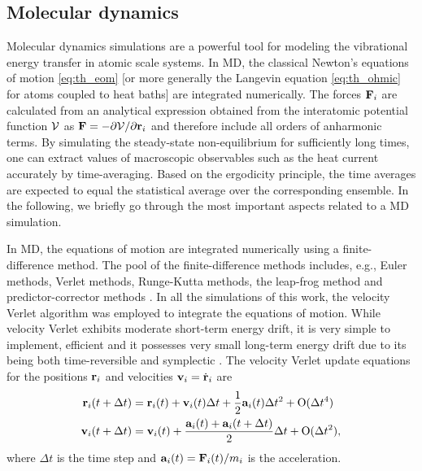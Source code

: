 \subsection{Molecular dynamics}


Molecular dynamics simulations are a powerful tool for modeling the vibrational energy transfer in atomic scale systems. In MD, the classical Newton's equations of motion \eqref{eq:th_eom} [or more generally the Langevin equation \eqref{eq:th_ohmic} for atoms coupled to heat baths] are integrated numerically. The forces $\mathbf{F}_i$ are calculated from an analytical expression obtained from the interatomic potential function $\mathcal{V}$ as $\mathbf{F}=-\partial \mathcal{V}/\partial \mathbf{r}_i$ and therefore include all orders of anharmonic terms. By simulating the steady-state non-equilibrium for sufficiently long times, one can extract values of macroscopic observables such as the heat current accurately by time-averaging. Based on the ergodicity principle, the time averages are expected to equal the statistical average over the corresponding ensemble. In the following, we briefly go through the most important aspects related to a MD simulation.




In MD, the equations of motion are integrated numerically using a finite-difference method. The pool of the finite-difference methods includes, e.g., Euler methods, Verlet methods, Runge-Kutta methods, the leap-frog method and predictor-corrector methods \cite{}. In all the simulations of this work, the velocity Verlet algorithm was employed to integrate the equations of motion. While velocity Verlet exhibits moderate short-term energy drift, it is very simple to implement, efficient and it possesses very small long-term energy drift due to its being both time-reversible and symplectic \cite{}. The velocity Verlet update equations for the positions $\mathbf{r}_i$ and velocities $\mathbf{v}_i=\dot{\mathbf{r}}_i$ are \cite{}
\begin{alignat}{2}
  \mathbf{r}_i(t+\Delta t) &= \mathbf{r}_i(t) + \mathbf{v}_i(t)\Delta t+  \frac{1}{2}\mathbf{a}_i(t) \Delta t^2 + \mathrm{O}(\Delta t^4) \\
  \mathbf{v}_i(t+\Delta t) &= \mathbf{v}_i(t) + \frac{ \mathbf{a}_i(t)+\mathbf{a}_i(t+\Delta t)}{2} \Delta t+ \mathrm{O}(\Delta t^2) ,
\end{alignat}
where $\Delta t$ is the time step and $\mathbf{a}_i(t)=\mathbf{F}_i(t)/m_i$ is the acceleration.




